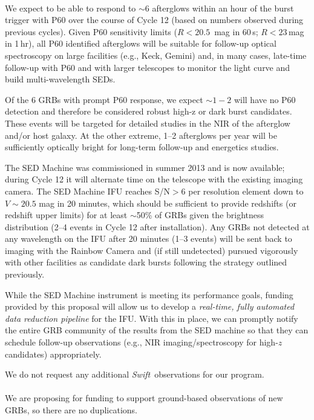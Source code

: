 \documentclass[letterpaper,11pt]{article}
\newcommand{\swift}{\textit{Swift}}
\begin{document}
\smallskip\\
We expect to be able to respond to $\sim 6$ afterglows within an hour of the burst
trigger with P60 over the course of Cycle 12 (based on numbers observed during 
previous cycles).  Given P60 sensitivity limits ($R < 20.5$\, mag in 60\,s; 
$R < 23$\,mag in 1\,hr), all P60 identified afterglows will be suitable for 
follow-up optical spectroscopy on large facilities (e.g., Keck, Gemini) and, in 
many cases, late-time follow-up with P60 and with larger telescopes to monitor 
the light curve and build multi-wavelength SEDs.  

Of the 6 GRBs with prompt P60 response, we expect $\sim 1-2$ will have
no P60 detection and therefore be considered robust high-z or dark 
burst candidates.  These events will be targeted for detailed studies
in the NIR of the afterglow and/or host galaxy.  At the other extreme, 1--2 
afterglows per year will be sufficiently optically bright for long-term 
follow-up and energetics studies.

The SED Machine was commissioned in summer 2013 and is now available; 
during Cycle 12 it will alternate time on the telescope with the existing 
imaging camera.  The SED Machine IFU
reaches S/N$>$6 per resolution element down to $V \sim 20.5$ mag in 20 minutes,
which should be sufficient to provide redshifts (or redshift upper limits) 
for at least $\sim$50\% of GRBs given the brightness distribution 
(2--4 events in Cycle 12 after installation).  Any GRBs not detected at any 
wavelength on the IFU after 20 minutes (1--3 events) will be sent back to 
imaging with the Rainbow Camera and (if still undetected) pursued vigorously 
with other facilities as candidate dark bursts following the strategy outlined 
previously.

While the SED Machine instrument is meeting its performance goals, funding 
provided by this proposal will allow us to develop a \textit{real-time,
fully automated data reduction pipeline} for the IFU.  With this in place,
we can promptly notify the entire GRB community of the results from the
SED machine so that they can schedule follow-up observations (e.g.,
NIR imaging/spectroscopy for high-$z$ candidates) appropriately.

We do not request any additional \swift\ observations for our program. \\

\smallskip\\
We are proposing for funding to support ground-based observations of new GRBs, so 
there are no duplications.\\
\end{document}
